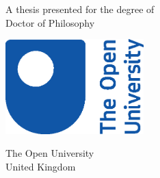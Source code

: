 \begin{titlepage}
    \begin{center}
        \vspace*{1cm}
            
        \Huge
        \textbf{\thetitle}
            
        \vspace{0.5cm}
        \LARGE
        \makeatletter \@subtitle \makeatother %
            
        \vspace{1.5cm}
            
        \textbf{\theauthor}
            
        \vfill
            
        A thesis presented for the degree of\\
        Doctor of Philosophy
            
        \vspace{0.8cm}
            
        \includegraphics[width=0.4\textwidth]{images/OU-logo-2017.eps}
        \vspace{1.6cm}
        
        \centering
        \usebox{\largestimage}
        \hfill
        
        
        \vspace{0.8cm}
            
        \Large
        The Open University\\
        United Kingdom\\
        \thedate
            
    \end{center}
\end{titlepage}